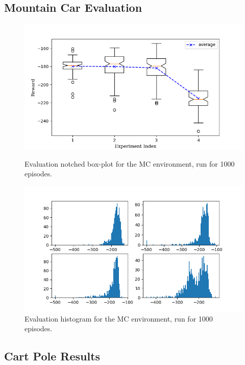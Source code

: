 \documentclass[hidelinks,journal]{IEEEtran}
\begin{document}
\begin{appendices}
\subsection{Mountain Car Evaluation}
\begin{figure}[!h]
  \centering
  \includegraphics[scale=1]{graph/mcEvalBox.png}
  \caption{Evaluation notched box-plot for the MC environment, run for 1000 episodes.}
  \includegraphics[scale=1]{graph/mcEvalHist.png}
  \caption{Evaluation histogram for the MC environment, run for 1000 episodes.}
\end{figure}
\pagebreak

\subsection{Cart Pole Results}


\end{appendices}
\end{document}
